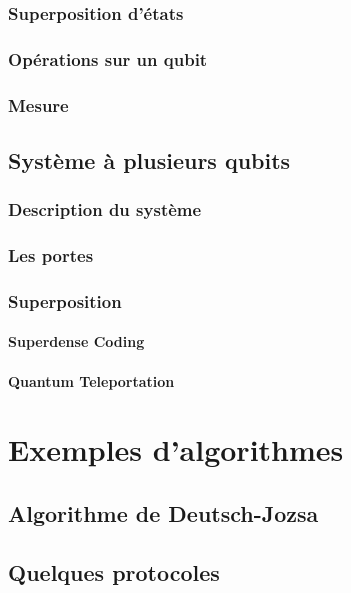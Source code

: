\documentclass[11pt]{report}
\begin{document}
\section{Superposition d'états}
\lipsum[2-4]

\section{Opérations sur un qubit}
\lipsum[2-4]

\section{Mesure}
\lipsum[2-4]

\chapter{Système à plusieurs qubits}
\section{Description du système}
\lipsum[2-4]

\section{Les portes}
\lipsum[2-4]

\section{Superposition}
\lipsum[2-4]

\subsection{Superdense Coding}
\lipsum[2-4]

\subsection{Quantum Teleportation}
\lipsum[2-4]

\part{Exemples d'algorithmes}
\chapter{Algorithme de Deutsch-Jozsa}
\lipsum[2-4]

\chapter{Quelques protocoles}
\lipsum[2-4]
\end{document}
